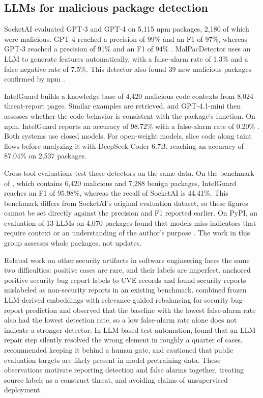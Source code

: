 \documentclass[a4paper,fleqn]{cas-dc}
\begin{document}
\subsection{LLMs for malicious package detection}
SocketAI evaluated GPT-3 and GPT-4 on 5,115 npm packages, 2,180 of which were
malicious. GPT-4 reached a precision of 99\% and an F1 of 97\%, whereas GPT-3
reached a precision of 91\% and an F1 of 94\% \citep{zahan2025leveraging}.
MalPacDetector uses an LLM to generate features automatically, with a
false-alarm rate of 1.3\% and a false-negative rate of 7.5\%. This detector also
found 39 new malicious packages confirmed by npm \citep{wang2025malpacdetector}.

IntelGuard builds a knowledge base of 4,420 malicious code contexts from 8,024
threat-report pages. Similar examples are retrieved, and GPT-4.1-mini then
assesses whether the code behavior is consistent with the package's function. On
npm, IntelGuard reports an accuracy of 98.72\% with a false-alarm rate of 0.20\%
\citep{guo2026bridging}. Both systems use closed models. For open-weight
models, \citet{nguyen2025taint} slice code along taint flows before
analyzing it with DeepSeek-Coder 6.7B, reaching an accuracy of 87.04\% on 2,537
packages.

Cross-tool evaluations test these detectors on the same data. On the benchmark of
\citet{guo2026effective}, which contains 6,420 malicious and 7,288 benign
packages, IntelGuard reaches an F1 of 95.98\%, whereas the recall of
SocketAI is 44.41\%. This benchmark differs from SocketAI's original evaluation
dataset, so these figures cannot be set directly against the precision and F1
reported earlier. On PyPI, an evaluation of 13 LLMs on 4,070 packages found that
models miss indicators that require context or an understanding of the author's
purpose \citep{ryan2026evaluation}. The work in this group assesses whole
packages, not updates.

Related work on other security artifacts in software engineering faces the same
two difficulties: positive cases are rare, and their labels are imperfect.
\citet{wu2020cve} anchored positive security bug report labels to CVE records
and found security reports mislabeled as non-security reports in an existing
benchmark. \citet{jamwal2027llmsec} combined frozen LLM-derived embeddings with
relevance-guided rebalancing for security bug report prediction and observed that
the baseline with the lowest false-alarm rate also had the lowest detection rate,
so a low false-alarm rate alone does not indicate a stronger detector. In LLM-based
test automation, \citet{malhotra2027llm} found that an LLM repair step silently
resolved the wrong element in roughly a quarter of cases, recommended keeping it
behind a human gate, and cautioned that public evaluation targets are likely
present in model pretraining data. These observations motivate reporting
detection and false alarms together, treating source labels as a construct
threat, and avoiding claims of unsupervised deployment.
\end{document}
